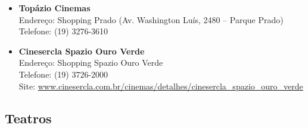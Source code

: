 \begin{itemize}
\item   \textbf{Topázio Cinemas}
		\\Endereço: Shopping Prado (Av. Washington Luís, 2480 -- Parque Prado)
		\\Telefone: (19) 3276-3610

\item   \textbf{Cinesercla Spazio Ouro Verde}
		\\Endereço: Shopping Spazio Ouro Verde 
		\\Telefone: (19) 3726-2000
		\\Site: \url{www.cinesercla.com.br/cinemas/detalhes/cinesercla_spazio_ouro_verde}
\end{itemize}

\subsection{Teatros}

